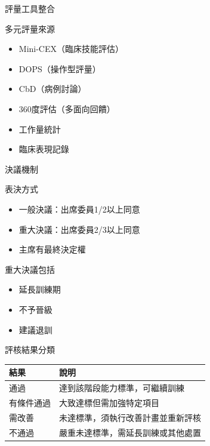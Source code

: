 \documentclass[aspectratio=169,12pt]{beamer}
\begin{document}
\begin{frame}{評量工具整合}
\begin{block}{多元評量來源}
\begin{itemize}
    \item Mini-CEX（臨床技能評估）
    \item DOPS（操作型評量）
    \item CbD（病例討論）
    \item 360度評估（多面向回饋）
    \item 工作量統計
    \item 臨床表現記錄
\end{itemize}
\end{block}
\end{frame}

\begin{frame}{決議機制}
\begin{block}{表決方式}
\begin{itemize}
    \item 一般決議：出席委員1/2以上同意
    \item 重大決議：出席委員2/3以上同意
    \item 主席有最終決定權
\end{itemize}
\end{block}

\begin{exampleblock}{重大決議包括}
\begin{itemize}
    \item 延長訓練期
    \item 不予晉級
    \item 建議退訓
\end{itemize}
\end{exampleblock}
\end{frame}

\begin{frame}{評核結果分類}
\begin{table}
\footnotesize
\begin{tabular}{lp{7cm}}
\toprule
\textbf{結果} & \textbf{說明} \\
\midrule
通過 & 達到該階段能力標準，可繼續訓練 \\
有條件通過 & 大致達標但需加強特定項目 \\
需改善 & 未達標準，須執行改善計畫並重新評核 \\
不通過 & 嚴重未達標準，需延長訓練或其他處置 \\
\bottomrule
\end{tabular}
\end{table}
\end{frame}
\end{document}
